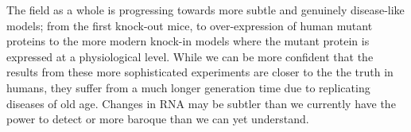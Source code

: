 






%

%
%
%




%


The field as a whole is progressing towards more subtle and genuinely disease-like models; from the first knock-out mice, to over-expression of human mutant proteins to the more modern knock-in models where the mutant protein is expressed at a physiological level. While we can be more confident that the results from these more sophisticated experiments are closer to the the truth in humans, they suffer from a much longer generation time due to replicating diseases of old age. Changes in RNA may be subtler than we currently have the power to detect or more baroque than we can yet understand. 







